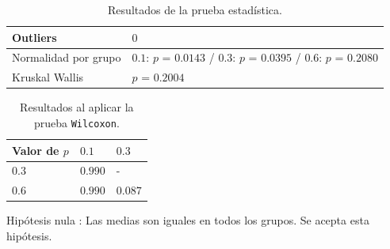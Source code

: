 \documentclass{article}
\begin{document}
\begin{table}[h!]
\centering
\caption{Resultados de la prueba estadística.}
\smallskip

\begin{tabular}{ |p{4cm}|p{8cm}|}
 \hline
 Outliers & $0$ \\
 \hline
 Normalidad por grupo & $0.1$: $p$ = $0.0143$ / $0.3$: $p$ = $0.0395$ / $0.6$: $p$ = $0.2080$ \\
 \hline
 Kruskal Wallis & $p$ = $0.2004$ \\
 \hline
\end{tabular}
\label{Cuadro13}
\end{table}

\begin{table}[h!]
\centering
\caption{Resultados al aplicar la prueba \texttt{Wilcoxon}.}
\smallskip

\begin{tabular}{|p{1.7cm}|p{1.7cm}|p{1.7cm}|}
 \hline
Valor de $p$ & $0.1$ & $0.3$ \\
 \hline
 $0.3$ & $0.990$ & -   \\
 \hline
 $0.6$ & $0.990$ & $0.087$  \\
 \hline
\end{tabular}
\label{Cuadro14}
\end{table}

Hipótesis nula : Las medias son iguales en todos los grupos. Se acepta esta hipótesis.
\end{document}
